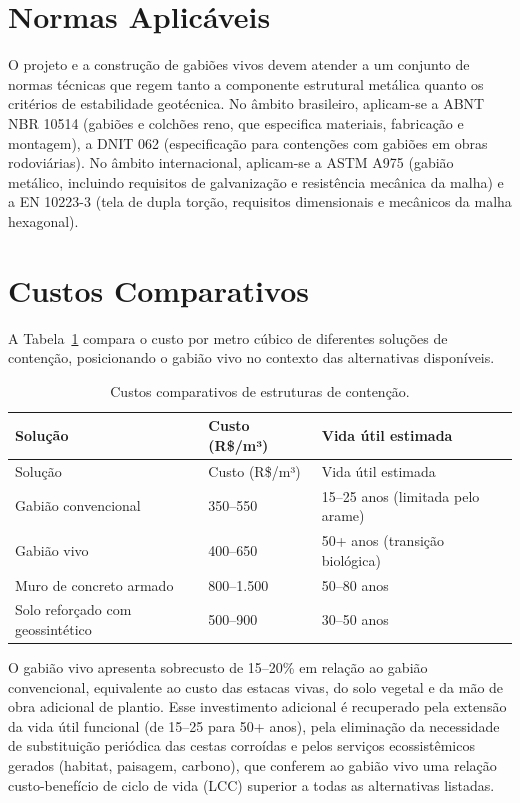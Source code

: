 \documentclass[
  portuguese,
  11pt,
  a4paper,
  open=any]{scrbook}
\begin{document}
\section{Normas Aplicáveis}\label{normas-aplicuxe1veis}

O projeto e a construção de gabiões vivos devem atender a um conjunto de
normas técnicas que regem tanto a componente estrutural metálica quanto
os critérios de estabilidade geotécnica. No âmbito brasileiro,
aplicam-se a ABNT NBR 10514 (gabiões e colchões reno, que especifica
materiais, fabricação e montagem), a DNIT 062 (especificação para
contenções com gabiões em obras rodoviárias). No âmbito internacional,
aplicam-se a ASTM A975 (gabião metálico, incluindo requisitos de
galvanização e resistência mecânica da malha) e a EN 10223-3 (tela de
dupla torção, requisitos dimensionais e mecânicos da malha hexagonal).

\section{Custos Comparativos}\label{custos-comparativos-1}

A Tabela~\ref{tbl-custos-gabiao} compara o custo por metro cúbico de
diferentes soluções de contenção, posicionando o gabião vivo no contexto
das alternativas disponíveis.

\begin{longtable}[]{@{}lll@{}}
\caption{Custos comparativos de estruturas de
contenção.}\label{tbl-custos-gabiao}\tabularnewline
\toprule\noalign{}
Solução & Custo (R\$/m³) & Vida útil estimada \\
\midrule\noalign{}
\endfirsthead
\toprule\noalign{}
Solução & Custo (R\$/m³) & Vida útil estimada \\
\midrule\noalign{}
\endhead
\bottomrule\noalign{}
\endlastfoot
Gabião convencional & 350--550 & 15--25 anos (limitada pelo arame) \\
Gabião vivo & 400--650 & 50+ anos (transição biológica) \\
Muro de concreto armado & 800--1.500 & 50--80 anos \\
Solo reforçado com geossintético & 500--900 & 30--50 anos \\
\end{longtable}

O gabião vivo apresenta sobrecusto de 15--20\% em relação ao gabião
convencional, equivalente ao custo das estacas vivas, do solo vegetal e
da mão de obra adicional de plantio. Esse investimento adicional é
recuperado pela extensão da vida útil funcional (de 15--25 para 50+
anos), pela eliminação da necessidade de substituição periódica das
cestas corroídas e pelos serviços ecossistêmicos gerados (habitat,
paisagem, carbono), que conferem ao gabião vivo uma relação
custo-benefício de ciclo de vida (LCC) superior a todas as alternativas
listadas.
\end{document}

